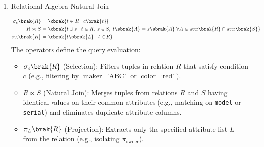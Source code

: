 \begin{enumerate}[label=\thesubsection.\arabic*, ref=\thesubsection.\theenumi]
	\item Relational Algebra Natural Join
	
\begin{align}
	\sigma_{c}\brak{R} &= \cbrak{t \in R \mid c\brak{t}} \label{eq:DA2025-selection}
	\\
	R \bowtie S &= \cbrak{t \cup s \mid t \in R, \; s \in S, \; t\sbrak{A} = s\sbrak{A} \; \forall A \in \text{attr}\brak{R} \cap \text{attr}\brak{S}} \label{eq:DA2025-join}
	\\
	\pi_{L}\brak{R} &= \cbrak{t\sbrak{L} \mid t \in R} \label{eq:DA2025-projection}
\end{align}
\solution
The operators define the query evaluation:
\begin{itemize}
	\item $\sigma_{c}\brak{R}$ (Selection): Filters tuples in relation $R$ that satisfy condition $c$ (e.g., filtering by $\text{maker} = \text{'ABC'}$ or $\text{color} = \text{'red'}$).
	\item $R \bowtie S$ (Natural Join): Merges tuples from relations $R$ and $S$ having identical values on their common attributes (e.g., matching on \texttt{model} or \texttt{serial}) and eliminates duplicate attribute columns.
	\item $\pi_{L}\brak{R}$ (Projection): Extracts only the specified attribute list $L$ from the relation (e.g., isolating $\pi_{\text{owner}}$).
\end{itemize}
	

\end{enumerate}
